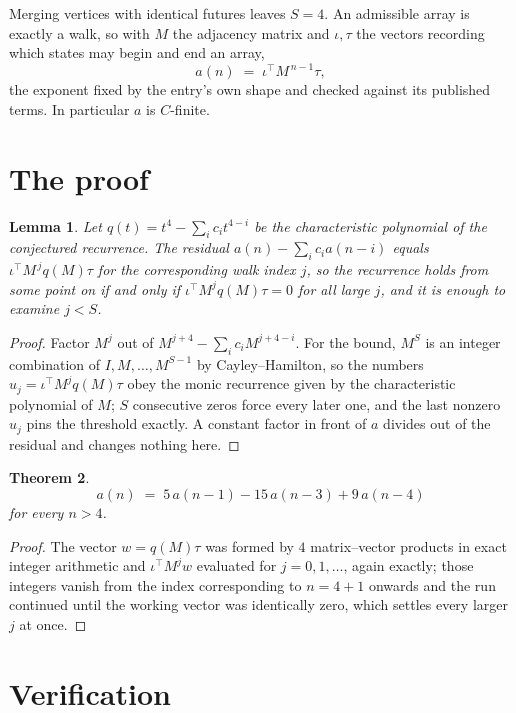 \documentclass[11pt,a4paper]{article}
\theoremstyle{plain}
\newtheorem{theorem}{Theorem}
\newtheorem{lemma}[theorem]{Lemma}
\theoremstyle{definition}
\begin{document}
Merging vertices with identical futures leaves $S=4$. An admissible array is exactly a walk, so with $M$ the adjacency matrix and $\iota,\tau$ the vectors recording which states may begin and end an array,
\[
a(n)\;=\;\iota^{\!\top}M^{\,n-1}\tau ,
\]
the exponent fixed by the entry's own shape and checked against its published terms. In
particular $a$ is $C$-finite.

\section{The proof}

\begin{lemma}\label{lem:crit}
Let $q(t)=t^{4}-\sum_i c_it^{4-i}$ be the characteristic polynomial of the
conjectured recurrence. The residual $a(n)-\sum_ic_ia(n-i)$ equals
$\iota^{\!\top}M^{\,j}q(M)\tau$ for the corresponding walk index $j$, so the recurrence
holds from some point on if and only if $\iota^{\!\top}M^{j}q(M)\tau=0$ for all large $j$,
and it is enough to examine $j<S$.
\end{lemma}

\begin{proof}
Factor $M^{j}$ out of $M^{j+4}-\sum_ic_iM^{j+4-i}$. For the bound, $M^{S}$
is an integer combination of $I,M,\dots,M^{S-1}$ by Cayley--Hamilton, so the numbers
$u_j=\iota^{\!\top}M^{j}q(M)\tau$ obey the monic recurrence given by the characteristic
polynomial of $M$; $S$ consecutive zeros force every later one, and the last nonzero $u_j$
pins the threshold exactly. A constant factor in front of $a$ divides out of the residual and
changes nothing here.
\end{proof}

\begin{theorem}
\[
a(n)\;=\;5\,a(n-1) - 15\,a(n-3) + 9\,a(n-4)
\]
for every $n>4$.
\end{theorem}

\begin{proof}
The vector $w=q(M)\tau$ was formed by $4$ matrix--vector products in exact integer
arithmetic and $\iota^{\!\top}M^{j}w$ evaluated for $j=0,1,\dots$, again exactly; those
integers vanish from the index corresponding to $n=4+1$ onwards and the run continued
until the working vector was identically zero, which settles every larger $j$ at once.
\end{proof}

\section{Verification}
\end{document}
